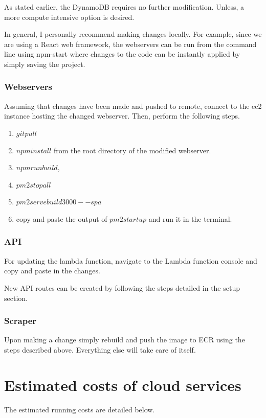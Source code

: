 \documentclass[12pt]{article}
\begin{document}
As stated earlier, the DynamoDB requires no further modification. Unless, a more compute intensive option is desired.

In general, I personally recommend making changes locally. For example, since we are using a React web framework, the webservers can be run from the command line using npm-start where changes to the code can be instantly applied by simply saving the project. 

\subsubsection{Webservers}

Assuming that changes have been made and pushed to remote, connect to the ec2 instance hosting the changed webserver. Then, perform the following steps.

\begin{enumerate}
    \item $git pull$
    \item $npm install$ from the root directory of the modified webserver.
    \item $npm run build$,
    \item $pm2 stop all$
    \item $pm2 serve build 3000 --spa$ 
    \item copy and paste the output of $pm2 startup$ and run it in the terminal.
\end{enumerate}

\subsubsection{API}

For updating the lambda function, navigate to the Lambda function console and copy and paste in the changes.

New API routes can be created by following the steps detailed in the setup section.

\subsubsection{Scraper}

Upon making a change simply rebuild and push the image to ECR using the steps described above. Everything else will take care of itself.

\section{Estimated costs of cloud services}
The estimated running costs are detailed below.
\end{document}
